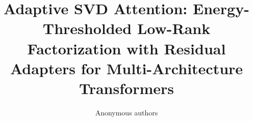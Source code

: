\title{\textbf{Adaptive SVD Attention: Energy-Thresholded Low-Rank Factorization with Residual Adapters for Multi-Architecture Transformers}}

\author{Anonymous authors}

